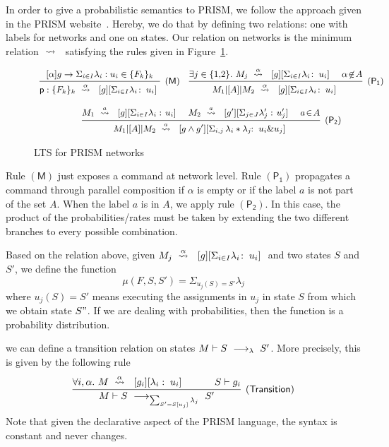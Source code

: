  In order to give a probabilistic semantics to
PRISM, we follow the approach given in the PRISM
website~\cite{prismemantics}.  Hereby, we do that by defining two
relations: one with labels for networks and one on states. Our
relation on networks is the minimum relation $\ \stackrel{}{\rightsquigarrow}\ {}$
satisfying the rules given in Figure~\ref{fig:semantics}.
% 
\begin{figure}[t]
  \begin{displaymath}\small
    \begin{array}{ccc}
      \infer[\mathsf{(M)}]
      { {\role{p}:\{F_k\}_k} \prismred{\alpha}\lab{g}{\Sigma_{i\in I}\lambda_i\!}{u_i} }
      {\command {\alpha}g\lambda u\in\{F_k\}_k}
      \quad
      \infer[\mathsf{(P_1)}]
      {M_1\ppp A M_2\prismred{\alpha}\lab{g}{\Sigma_{i\in I}\lambda_i\!}{u_i}}
      {
      \exists j\in\{1,\!2\}.\ 
      M_j\prismred{\alpha}\lab{g}{\Sigma_{i\in I}\lambda_i\!}{u_i}
      & \alpha\!\not\in\! A
        }
      \\\\
      \infer[\mathsf{(P_2)}]
      {M_1\ppp A M_2\prismred{a}\lab{g\land g'}
      {\Sigma_{i,j}\,\lambda_i*\lambda_j\!\!}{u_i\& u_j} }
      {
      M_1\prismred{a}\lab{g}{\Sigma_{i\in I}\lambda_i}{\!u_i} 
      & M_2\prismred{a}\lab{g'}{\Sigma_{j\in J}\lambda'_j}{\!u'_j} 
      & a\!\in\! A}
    \end{array}
  \end{displaymath}
  \caption{LTS for PRISM networks} 
  \label{fig:semantics}
\end{figure}
Rule $\mathsf{(M)}$ just exposes a command at network level. Rule
$\mathsf{(P_1)}$ propagates a command through parallel composition if
$\alpha$ is empty or if the label $a$ is not part of the set $A$. When
the label $a$ is in $A$, we apply rule $\mathsf{(P_2)}$. In this case,
the product of the probabilities/rates must be taken by extending the
two different branches to every possible combination. 

Based on the relation above, given
$M_j\ \stackrel{\alpha}{\rightsquigarrow}\ \ [g][\Sigma_{i\in I}\lambda_i\!:\;u_i]\ $ and two
states $S$ and $S'$, we define the function
$$\mu(F,S,S') = \Sigma_{u_j(S)=S'}\lambda_j$$
where $u_j(S) = S'$ means executing the assignments in $u_j$ in state
$S$ from which we obtain state $S"$. If we are dealing with
probabilities, then the function is a probability distribution.


we can define a transition relation on
states $M\vdash S\ \longrightarrow_{\lambda}\ S'$. More precisely, this is given by
the following rule
$$
\infer[\mathsf{(Transition)}]
{
  M\vdash S\red{\sum_{S'= S[u_j]} \lambda_j}S'
}
{
  \forall i,\alpha.\ M\prismred{\alpha}\lab {g_i}{\lambda_i}{u_i}
  \quad&\quad
  S\vdash g_i
}
$$
Note that given the declarative
aspect of the PRISM language, the syntax is constant and never
changes.

